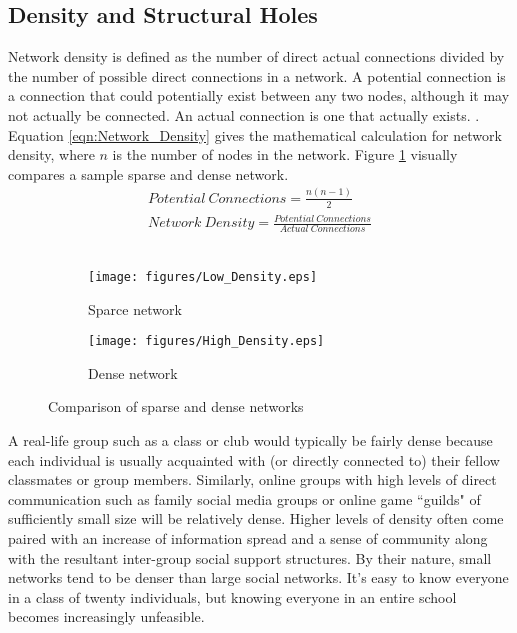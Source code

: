 {\subsection{Density and Structural Holes}
Network density is defined as the number of direct actual connections divided by the number of possible direct connections in a network. A potential connection is a connection that could potentially exist between any two nodes, although it may not actually be connected. An actual connection is one that actually exists. \cite{lawyer2015understanding}. Equation \ref{eqn:Network_Density} gives the mathematical calculation for network density, where $n$ is the number of nodes in the network. Figure \ref{fig:Density} visually compares a sample sparse and dense network. 
\begin{equation}\label{eqn:Network_Density}
\left.\begin{aligned}
Potential \  Connections = \frac{n(n-1)}{2}\\
Network \  Density = \frac{Potential \  Connections}{Actual \  Connections}
\end{aligned}\right.
\end{equation}\\
\begin{figure}[!htbp] \centering
\begin{subfigure}[b]{0.4\textwidth}
  \texttt{[image: figures/Low\_Density.eps]}
  \caption{Sparce network}
\end{subfigure}
\begin{subfigure}[b]{0.4\textwidth}
  \texttt{[image: figures/High\_Density.eps]}
  \caption{Dense network}
\end{subfigure}
  \caption{Comparison of sparse and dense networks}
  \label{fig:Density}
\end{figure}
A real-life group such as a class or club would typically be fairly dense because each individual is usually acquainted with (or directly connected to) their fellow classmates or group members. Similarly, online groups with high levels of direct communication such as family social media groups or online game ``guilds" of sufficiently small size will be relatively dense. Higher levels of density often come paired with an increase of information spread and a sense of community along with the resultant inter-group social support structures. By their nature, small networks tend to be denser than large social networks. It's easy to know everyone in a class of twenty individuals, but knowing everyone in an entire school becomes increasingly unfeasible.

}
